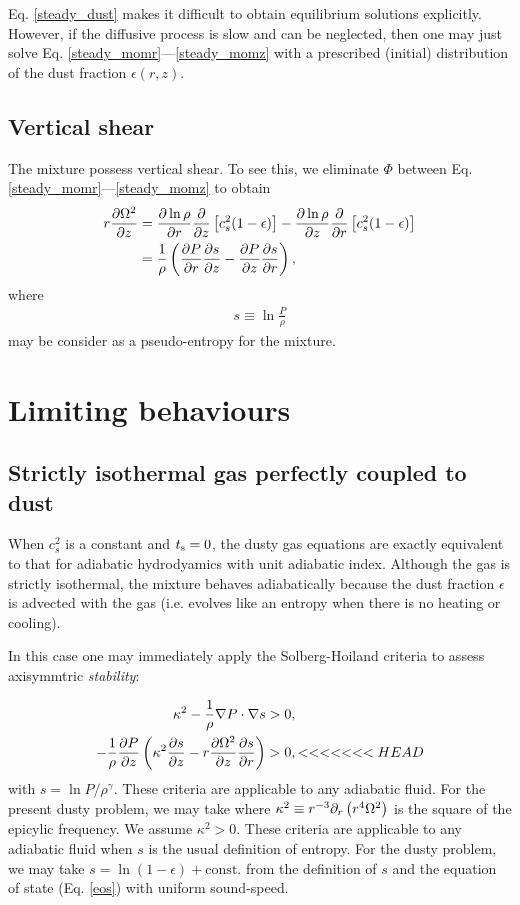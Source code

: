 Eq. \ref{steady_dust} makes it difficult to obtain equilibrium
solutions explicitly. However, if the diffusive process is slow and
can be neglected, then one may just solve
Eq. \ref{steady_momr}---\ref{steady_momz} with a prescribed (initial)
distribution of the dust fraction $\epsilon(r,z)$. 

\subsection{Vertical shear}
The mixture possess vertical shear. To see this, we eliminate $\Phi$
between Eq. \ref{steady_momr}---\ref{steady_momz} to 
obtain 
\begin{align}\label{vshear}
  r\frac{\partial \Omega^2}{\partial z} &= \frac{\partial\ln{\rho}}{\partial r}\frac{\partial}{\partial
    z}\left[c_s^2(1-\epsilon)\right] - \frac{\partial\ln{\rho}}{\partial z}
  \frac{\partial}{\partial r} \left[c_s^2(1-\epsilon)\right]\\  
  & = \frac{1}{\rho}\left(\frac{\partial P}{\partial r}\frac{\partial s}{\partial z} -\frac{\partial
    P}{\partial z}\frac{\partial s}{\partial r} \right),\notag
\end{align}
where
\begin{align}
   s \equiv \ln \frac{P}{\rho}
\end{align}
may be consider as a pseudo-entropy for the mixture. 

\section{Limiting behaviours}

\subsection{Strictly isothermal gas perfectly coupled to dust}  
When $c_s^2$ is a constant and $t_\mathrm{s}=0$, the dusty gas equations are
exactly equivalent to that for adiabatic hydrodyamics with unit adiabatic
index. Although the gas is strictly isothermal, the mixture behaves 
adiabatically because the dust fraction $\epsilon$ is advected with
the gas (i.e. evolves like an entropy when there is no heating or
cooling). 

In this case one may immediately apply the Solberg-Hoiland
criteria to assess axisymmtric \emph{stability}:  

\begin{align}
  \kappa^2 - \frac{1}{\rho}\nabla P \cdot \nabla s &> 0,\\
  -\frac{1}{\rho}\frac{\partial P}{\partial z} \left(\kappa^2 \frac{\partial s}{\partial z} -
  r\frac{\partial\Omega^2}{\partial z}\frac{\partial s}{\partial r}\right) &>0, 
<<<<<<< HEAD
\end{align}
with $s = \ln{P/\rho^\gamma}$. These criteria are applicable to any adiabatic fluid. 
For the present dusty problem, we may take 
where $\kappa^2 \equiv r^{-3}\partial_r\left(r^4\Omega^2\right)$ is the
square of the epicylic frequency. We assume $\kappa^2>0$. 
These criteria are applicable to any adiabatic fluid when $s$
is the usual definition of entropy. For the dusty problem, we may take 
$s=\ln{(1-\epsilon)}+\mathrm{const.}$ from the definition of $s$ and  
the equation of state (Eq. \ref{eos}) with uniform sound-speed. 

